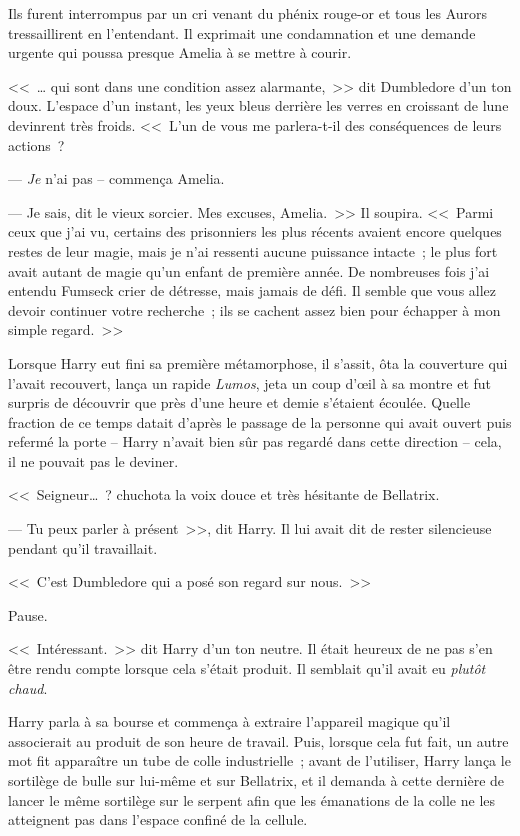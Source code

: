 Ils furent interrompus par un cri venant du phénix rouge-or et tous les Aurors tressaillirent en l'entendant. Il exprimait une condamnation et une demande urgente qui poussa presque Amelia à se mettre à courir.

<<~… qui sont dans une condition assez alarmante,~>> dit Dumbledore d'un ton doux. L'espace d'un instant, les yeux bleus derrière les verres en croissant de lune devinrent très froids. <<~L'un de vous me parlera-t-il des conséquences de leurs actions~?

--- \emph{Je} n'ai pas --  commença Amelia.

--- Je sais, dit le vieux sorcier. Mes excuses, Amelia.~>> Il soupira. <<~Parmi ceux que j'ai vu, certains des prisonniers les plus récents avaient encore quelques restes de leur magie, mais je n'ai ressenti aucune puissance intacte~; le plus fort avait autant de magie qu'un enfant de première année. De nombreuses fois j'ai entendu Fumseck crier de détresse, mais jamais de défi. Il semble que vous allez devoir continuer votre recherche~; ils se cachent assez bien pour échapper à mon simple regard.~>>

\later

Lorsque Harry eut fini sa première métamorphose, il s'assit, ôta la couverture qui l'avait recouvert, lança un rapide \emph{Lumos}, jeta un coup d'œil à sa montre et fut surpris de découvrir que près d'une heure et demie s'étaient écoulée. Quelle fraction de ce temps datait d'après le passage de la personne qui avait ouvert puis refermé la porte -- Harry n'avait bien sûr pas regardé dans cette direction -- cela, il ne pouvait pas le deviner.

<<~Seigneur…~? chuchota la voix douce et très hésitante de Bellatrix.

--- Tu peux parler à présent~>>, dit Harry. Il lui avait dit de rester silencieuse pendant qu'il travaillait.

<<~C'est Dumbledore qui a posé son regard sur nous.~>>

Pause.

<<~Intéressant.~>> dit Harry d'un ton neutre. Il était heureux de ne pas s'en être rendu compte lorsque cela s'était produit. Il semblait qu'il avait eu \emph{plutôt chaud}.

Harry parla à sa bourse et commença à extraire l'appareil magique qu'il associerait au produit de son heure de travail. Puis, lorsque cela fut fait, un autre mot fit apparaître un tube de colle industrielle~; avant de l'utiliser, Harry lança le sortilège de bulle sur lui-même et sur Bellatrix, et il demanda à cette dernière de lancer le même sortilège sur le serpent afin que les émanations de la colle ne les atteignent pas dans l'espace confiné de la cellule.

